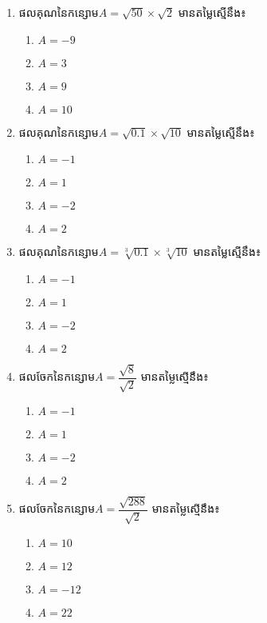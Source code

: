 \begin{enumerate}
\item ផលគុណនៃកន្សោម$A=\sqrt{50}\times \sqrt{2}$  មានតម្លៃស្មើនឹង៖
\begin{multicols}{4}
\begin{enumerate}[label=\alph*.]
	\item $A=-9$
	\item $A=3$
	\item $A=9$
	\item $A=10$
\end{enumerate}
\end{multicols}

\item ផលគុណនៃកន្សោម$A=\sqrt{0.1}\times \sqrt{10}$  មានតម្លៃស្មើនឹង៖
\begin{multicols}{4}
\begin{enumerate}[label=\alph*.]
	\item $A=-1$
	\item $A=1$
	\item $A=-2$
	\item $A=2$
\end{enumerate}
\end{multicols}

\item ផលគុណនៃកន្សោម$A=\sqrt[3]{0.1}\times \sqrt[3]{10}$  មានតម្លៃស្មើនឹង៖
\begin{multicols}{4}
\begin{enumerate}[label=\alph*.]
	\item $A=-1$
	\item $A=1$
	\item $A=-2$
	\item $A=2$
\end{enumerate}
\end{multicols}

\item ផលចែកនៃកន្សោម$A=\dfrac{\sqrt{8}}{\sqrt{2}}$  មានតម្លៃស្មើនឹង៖
\begin{multicols}{4}
\begin{enumerate}[label=\alph*.]
	\item $A=-1$
	\item $A=1$
	\item $A=-2$
	\item $A=2$
\end{enumerate}
\end{multicols}

\item ផលចែកនៃកន្សោម$A=\dfrac{\sqrt{288}}{\sqrt{2}}$  មានតម្លៃស្មើនឹង៖
\begin{multicols}{4}
\begin{enumerate}[label=\alph*.]
	\item $A=10$
	\item $A=12$
	\item $A=-12$
	\item $A=22$
\end{enumerate}
\end{multicols}


\end{enumerate}
